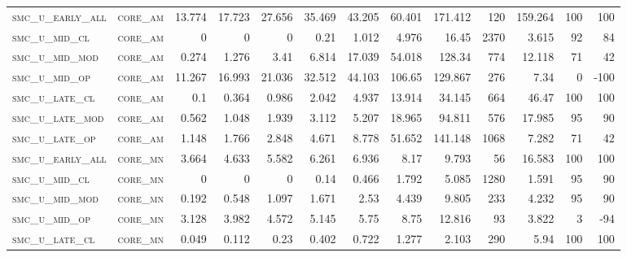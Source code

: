 \begin{landscape}
\begin{center}
\begin{footnotesize}
\begin{longtable}{llrrrrrrrr|rrr}
\textsc{smc\_u\_early\_all} & \textsc{core\_am  }   & 13.774   & 17.723   & 27.656   & 35.469   & 43.205   & 60.401   & 171.412   & 120    & 159.264       & 100           & 100             \\
\textsc{smc\_u\_mid\_cl   } & \textsc{core\_am  }   & 0        & 0        & 0        & 0.21     & 1.012    & 4.976    & 16.45     & 2370   & 3.615         & 92            & 84              \\
\textsc{smc\_u\_mid\_mod  } & \textsc{core\_am  }   & 0.274    & 1.276    & 3.41     & 6.814    & 17.039   & 54.018   & 128.34    & 774    & 12.118        & 71            & 42              \\
\textsc{smc\_u\_mid\_op   } & \textsc{core\_am  }   & 11.267   & 16.993   & 21.036   & 32.512   & 44.103   & 106.65   & 129.867   & 276    & 7.34          & 0             & -100            \\
\textsc{smc\_u\_late\_cl  } & \textsc{core\_am  }   & 0.1      & 0.364    & 0.986    & 2.042    & 4.937    & 13.914   & 34.145    & 664    & 46.47         & 100           & 100             \\
\textsc{smc\_u\_late\_mod } & \textsc{core\_am  }   & 0.562    & 1.048    & 1.939    & 3.112    & 5.207    & 18.965   & 94.811    & 576    & 17.985        & 95            & 90              \\
\textsc{smc\_u\_late\_op  } & \textsc{core\_am  }   & 1.148    & 1.766    & 2.848    & 4.671    & 8.778    & 51.652   & 141.148   & 1068   & 7.282         & 71            & 42              \\
\textsc{smc\_u\_early\_all} & \textsc{core\_mn  }   & 3.664    & 4.633    & 5.582    & 6.261    & 6.936    & 8.17     & 9.793     & 56     & 16.583        & 100           & 100             \\
\textsc{smc\_u\_mid\_cl   } & \textsc{core\_mn  }   & 0        & 0        & 0        & 0.14     & 0.466    & 1.792    & 5.085     & 1280   & 1.591         & 95            & 90              \\
\textsc{smc\_u\_mid\_mod  } & \textsc{core\_mn  }   & 0.192    & 0.548    & 1.097    & 1.671    & 2.53     & 4.439    & 9.805     & 233    & 4.232         & 95            & 90              \\
\textsc{smc\_u\_mid\_op   } & \textsc{core\_mn  }   & 3.128    & 3.982    & 4.572    & 5.145    & 5.75     & 8.75     & 12.816    & 93     & 3.822         & 3             & -94             \\
\textsc{smc\_u\_late\_cl  } & \textsc{core\_mn  }   & 0.049    & 0.112    & 0.23     & 0.402    & 0.722    & 1.277    & 2.103     & 290    & 5.94          & 100           & 100             \\

\end{longtable}
\end{footnotesize}
\end{center}
\end{landscape}
